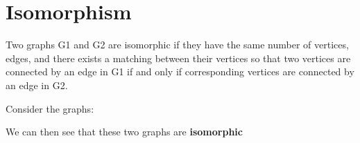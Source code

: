 \documentclass{report}
\begin{document}
    \section{\LARGE Isomorphism}
    \smallbreak \noindent
    \begin{definition}
        Two graphs G1 and G2 are isomorphic if they have the same number of vertices, edges, and there exists a matching between their vertices so that two vertices are connected by an edge in G1 if and only if corresponding vertices are connected by an edge in G2.
    \end{definition}
    \bigbreak \noindent 
    Consider the graphs:
    \bigbreak \noindent 
    \begin{minipage}[]{0.47\textwidth}
    \end{minipage}
    \begin{minipage}[]{0.47\textwidth}
    \end{minipage}
    \bigbreak \noindent 
    We can then see that these two graphs are \textbf{isomorphic}
    \bigbreak \noindent 

    \pagebreak \bigbreak \noindent 
\end{document}

